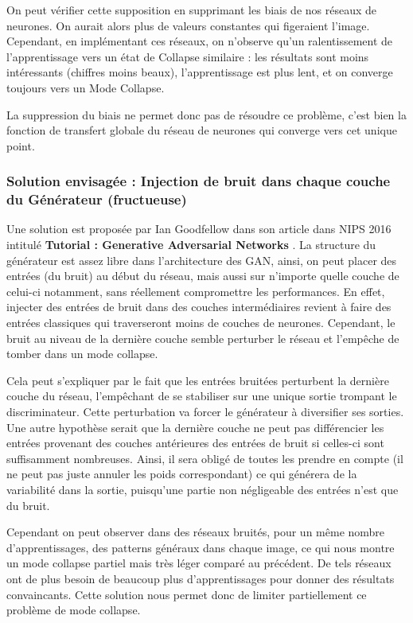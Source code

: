 On peut vérifier cette supposition en supprimant les biais de nos réseaux de neurones. On aurait alors plus de valeurs constantes qui figeraient l'image. Cependant, en implémentant ces réseaux, on n'observe qu'un ralentissement de l'apprentissage vers un état de Collapse similaire : les résultats sont moins intéressants (chiffres moins beaux), l'apprentissage est plus lent, et on converge toujours vers un Mode Collapse.

La suppression du biais ne permet donc pas de résoudre ce problème, c'est bien la fonction de transfert globale du réseau de neurones qui converge vers cet unique point.  


\subsubsection{Solution envisagée : Injection de bruit dans chaque couche du Générateur (fructueuse)}

Une solution est proposée par Ian Goodfellow dans son article dans NIPS 2016 intitulé \textbf{Tutorial : Generative Adversarial Networks} \cite{goodfellow_nips_2016}. La structure du générateur est assez libre dans l'architecture des GAN, ainsi, on peut placer des entrées (du bruit) au début du réseau, mais aussi sur n'importe quelle couche de celui-ci notamment, sans réellement compromettre les performances. En effet, injecter des entrées de bruit dans des couches intermédiaires revient à faire des entrées classiques qui traverseront moins de couches de neurones. Cependant, le bruit au niveau de la dernière couche semble perturber le réseau et l'empêche de tomber dans un mode collapse. 

Cela peut s'expliquer par le fait que les entrées bruitées perturbent la dernière couche du réseau, l'empêchant de se stabiliser sur une unique sortie trompant le discriminateur. Cette perturbation va forcer le générateur à diversifier ses sorties.
Une autre hypothèse serait que la dernière couche ne peut pas différencier les entrées provenant des couches antérieures des entrées de bruit si celles-ci sont suffisamment nombreuses. Ainsi, il sera obligé de toutes les prendre en compte (il ne peut pas juste annuler les poids correspondant) ce qui générera de la variabilité dans la sortie, puisqu'une partie non négligeable des entrées n'est que du bruit.

Cependant on peut observer dans des réseaux bruités, pour un même nombre d'apprentissages, des patterns généraux dans chaque image, ce qui nous montre un mode collapse partiel mais très léger comparé au précédent. De tels réseaux ont de plus besoin de beaucoup plus d'apprentissages pour donner des résultats convaincants. Cette solution nous permet donc de limiter partiellement ce problème de mode collapse.

